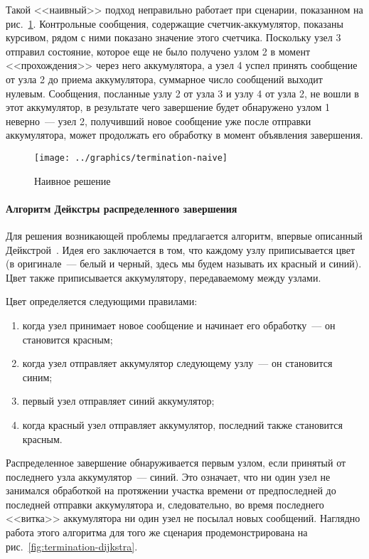 Такой <<наивный>> подход неправильно работает при сценарии, показанном на
рис.~\ref{fig:termination-naive}. Контрольные сообщения, содержащие счетчик-аккумулятор,
показаны курсивом, рядом с ними показано значение этого счетчика. Поскольку узел 3
отправил состояние, которое еще не было получено узлом 2 в момент <<прохождения>> через
него аккумулятора, а узел 4 успел принять сообщение от узла 2 до приема аккумулятора,
суммарное число сообщений выходит нулевым. Сообщения, посланные узлу 2 от узла 3 и узлу 4
от узла 2, не вошли в этот аккумулятор, в результате чего завершение будет обнаружено
узлом 1 неверно~--- узел 2, получивший новое сообщение уже после отправки аккумулятора,
может продолжать его обработку в момент объявления завершения.

\begin{figure}[htb]
  \centering
  \texttt{[image: ../graphics/termination-naive]}  
  \caption{Наивное решение}
\label{fig:termination-naive}
\end{figure}

\paragraph{Алгоритм Дейкстры распределенного завершения}
\label{sec:distr-term-dijkstra}

Для решения возникающей проблемы предлагается алгоритм, впервые описанный
Дейкстрой~\cite{DistrTerm}. Идея его заключается в том, что каждому узлу приписывается
цвет (в оригинале~--- белый и черный, здесь мы будем называть их красный и синий). Цвет
также приписывается аккумулятору, передаваемому между узлами.

Цвет определяется следующими правилами:
\begin{enumerate}
\item когда узел принимает новое сообщение и начинает его обработку~--- он становится красным;
\item когда узел отправляет аккумулятор следующему узлу~--- он становится синим;
\item первый узел отправляет синий аккумулятор;
\item когда красный узел отправляет аккумулятор, последний также становится красным.
\end{enumerate}

Распределенное завершение обнаруживается первым узлом, если принятый от последнего узла
аккумулятор~--- синий. Это означает, что ни один узел не занимался обработкой на
протяжении участка времени от предпоследней до последней отправки аккумулятора и,
следовательно, во время последнего <<витка>> аккумулятора ни один узел не посылал новых
сообщений. Наглядно работа этого алгоритма для того же сценария продемонстрирована на
рис.~\ref{fig:termination-dijkstra}.

